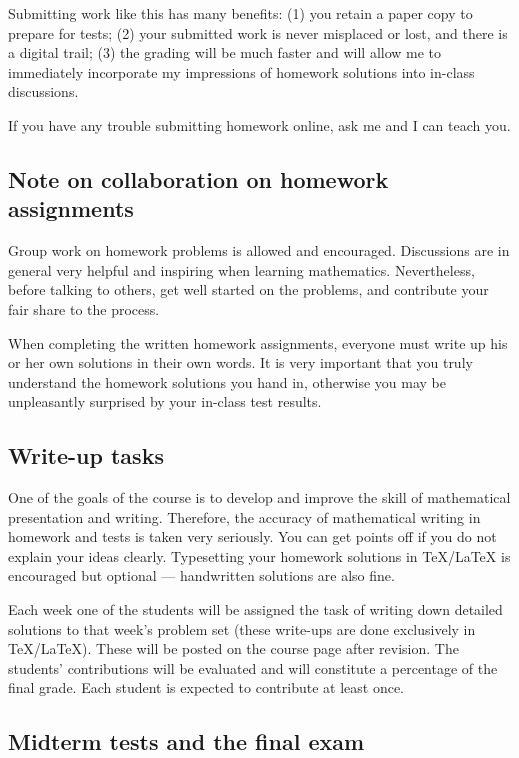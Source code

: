 \documentclass[oneside,11pt]{amsart}
\begin{document}
Submitting work like this has many benefits:
(1) you retain a paper copy to
prepare for tests;
(2) your submitted work is never misplaced or lost, and there is a digital trail;
(3) the grading will be much faster and will allow me to immediately
incorporate my impressions of homework solutions into in-class
discussions.

If you have any trouble submitting homework online, ask me and I can teach you.

\subsection*{Note on collaboration on homework assignments}
\label{collaboration}

Group work on homework problems is allowed and encouraged.
Discussions are in general very
helpful and inspiring when learning mathematics.
Nevertheless, before talking to others, get well started
on the problems, and contribute your fair share to the process.

When completing the written homework assignments, everyone must write up his or her own
solutions in their own words.
It is very important that you truly understand the homework solutions you hand
in, otherwise you may be unpleasantly surprised by your in-class test results.

\subsection{Write-up tasks}

One of the goals of the course is to develop and improve
the skill of mathematical presentation and writing.
Therefore, the accuracy of mathematical writing
in homework and tests
is taken very seriously. You can get points off
if you do not explain your ideas clearly.
Typesetting your homework solutions in \TeX/\LaTeX{} is encouraged
but optional --- handwritten solutions are also fine.

Each week one of the students will be assigned the task of
writing down
detailed solutions to that week’s problem set (these write-ups are done
exclusively in \TeX/\LaTeX{}). 
These will be posted on the
course page after revision. The students' contributions will be evaluated and
will constitute a percentage of the final grade. Each student is expected
to contribute at least once.

\subsection{Midterm tests and the final exam}
\end{document}
